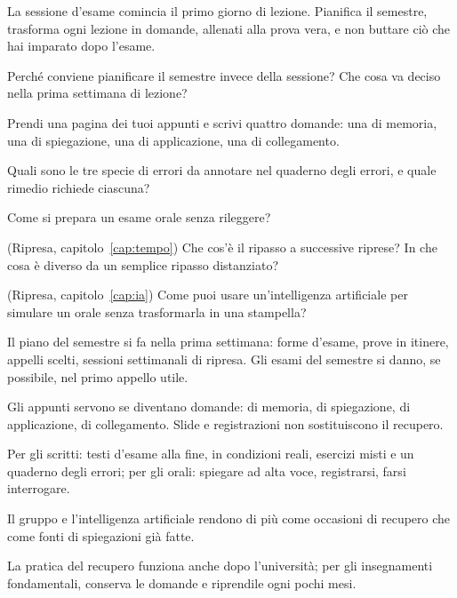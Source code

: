 \begin{daricordare}
La sessione d'esame comincia il primo giorno di lezione. Pianifica il
semestre, trasforma ogni lezione in domande, allenati alla prova
vera, e non buttare ciò che hai imparato dopo l'esame.
\end{daricordare}

\begin{domande}
  \item Perché conviene pianificare il semestre invece della sessione?
        Che cosa va deciso nella prima settimana di lezione?
  \item Prendi una pagina dei tuoi appunti e scrivi quattro domande:
        una di memoria, una di spiegazione, una di applicazione, una di
        collegamento.
  \item Quali sono le tre specie di errori da annotare nel quaderno
        degli errori, e quale rimedio richiede ciascuna?
  \item Come si prepara un esame orale senza rileggere?
  \item (Ripresa, capitolo~\ref{cap:tempo}) Che cos'è il ripasso a
        successive riprese? In che cosa è diverso da un semplice
        ripasso distanziato?
  \item (Ripresa, capitolo~\ref{cap:ia}) Come puoi usare
        un'intelligenza artificiale per simulare un orale senza
        trasformarla in una stampella?
\end{domande}

\begin{sintesi}
  \item Il piano del semestre si fa nella prima settimana: forme
        d'esame, prove in itinere, appelli scelti, sessioni settimanali
        di ripresa. Gli esami del semestre si danno, se possibile, nel
        primo appello utile.
  \item Gli appunti servono se diventano domande: di memoria, di
        spiegazione, di applicazione, di collegamento. Slide e
        registrazioni non sostituiscono il recupero.
  \item Per gli scritti: testi d'esame alla fine, in condizioni reali,
        esercizi misti e un quaderno degli errori; per gli orali:
        spiegare ad alta voce, registrarsi, farsi interrogare.
  \item Il gruppo e l'intelligenza artificiale rendono di più come
        occasioni di recupero che come fonti di spiegazioni già fatte.
  \item La pratica del recupero funziona anche dopo l'università; per
        gli insegnamenti fondamentali, conserva le domande e riprendile
        ogni pochi mesi.
\end{sintesi}

\finecapitolo
